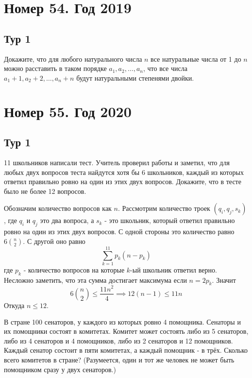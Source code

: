 \documentclass[11pt, a4paper]{problems_template}
\begin{document}
\chapter{Номер 54. Год 2019}

\section{Тур 1}

\begin{exercise}
Докажите, что для любого натурального числа $n$ все натуральные числа от 1 до $n$ можно расставить в таком порядке $a_{1}, a_{2}, \dots, a_{n}$, что все числа $a_{1} + 1, a_{2} + 2, \dots, a_{n} + n$ будут натуральными степенями двойки.
\end{exercise}


\chapter{Номер 55. Год 2020}

\section{Тур 1}

\begin{exercise}
11 школьников написали тест. Учитель проверил работы и заметил, что для любых двух вопросов теста найдутся хотя бы 6 школьников, каждый из которых ответил правильно ровно на один из этих двух вопросов. Докажите, что в тесте было не более 12 вопросов.
\end{exercise}

\begin{Solution}
Обозначим количество вопросов как $n$. Рассмотрим количество троек $(q_{i}, q_{j}, s_{k})$, где $q_{i}$ и $q_{j}$ это два вопроса, а $s_{k}$ - это школьник, который ответил правильно ровно на один из этих двух вопросов. С одной стороны это количество равно $6 \binom{n}{2}$. С другой оно равно
$$
\sum_{k = 1}^{11} p_{k} (n - p_{k})
$$
где $p_{k}$ - количество вопросов на которые $k$-ый школьник ответил верно. Несложно заметить, что эта сумма достигает максимума если $n = 2p_{k}$. Значит
$$
6\binom{n}{2} \leqslant \frac{11 n^{2}}{4} \implies 12(n - 1) \leqslant 11n 
$$
Откуда $n \leqslant 12$.
\end{Solution}

\begin{exercise}
В стране 100 сенаторов, у каждого из которых ровно 4 помощника. Сенаторы и их помощники состоят в комитетах. Комитет может состоять либо из 5 сенаторов, либо из 4 сенаторов и 4 помощников, либо из 2 сенаторов
и 12 помощников. Каждый сенатор состоит в пяти комитетах, а каждый помощник - в трёх. Сколько всего комитетов в стране? (Разумеется, один
и тот же человек не может быть помощником сразу у двух сенаторов.)
\end{exercise}
\end{document}
